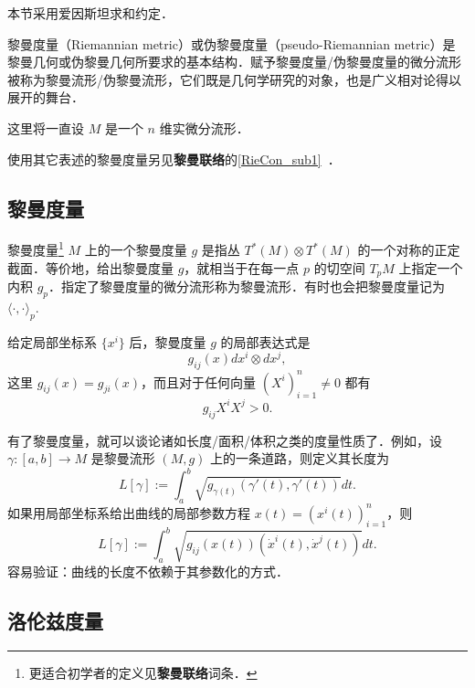 
本节采用爱因斯坦求和约定．

黎曼度量（Riemannian metric）或伪黎曼度量（pseudo-Riemannian metric）是黎曼几何或伪黎曼几何所要求的基本结构．赋予黎曼度量/伪黎曼度量的微分流形被称为黎曼流形/伪黎曼流形，它们既是几何学研究的对象，也是广义相对论得以展开的舞台．

这里将一直设 $M$ 是一个 $n$ 维实微分流形．

使用其它表述的黎曼度量另见\textbf{黎曼联络}的\autoref{RieCon_sub1}~．

\subsection{黎曼度量}
\begin{definition}{黎曼度量\footnote{更适合初学者的定义见\textbf{黎曼联络}词条．}}
$M$ 上的一个黎曼度量 $g$ 是指丛 $T^*(M)\otimes T^*(M)$ 的一个对称的正定截面．等价地，给出黎曼度量 $g$，就相当于在每一点 $p$ 的切空间 $T_pM$ 上指定一个内积 $g_p$．指定了黎曼度量的微分流形称为黎曼流形．有时也会把黎曼度量记为 $\langle\cdot,\cdot\rangle_p$.
\end{definition}
给定局部坐标系 $\{x^i\}$ 后，黎曼度量 $g$ 的局部表达式是
$$
g_{ij}(x)dx^i\otimes dx^j,
$$
这里 $g_{ij}(x)=g_{ji}(x)$，而且对于任何向量 $(X^i)_{i=1}^n\neq0$ 都有
$$
g_{ij}X^iX^j>0.
$$

有了黎曼度量，就可以谈论诸如长度/面积/体积之类的度量性质了．例如，设 $\gamma:[a,b]\to M$ 是黎曼流形 $(M,g)$ 上的一条道路，则定义其长度为
$$
L[\gamma]:=\int_{a}^b \sqrt{g_{\gamma(t)}(\gamma'(t),\gamma'(t))}dt.
$$
如果用局部坐标系给出曲线的局部参数方程 $x(t)=(x^i(t))_{i=1}^n$，则
$$
L[\gamma]:=\int_{a}^b \sqrt{g_{ij}(x(t))(\dot x^i(t),\dot x^j(t))}dt.
$$
容易验证：曲线的长度不依赖于其参数化的方式．

\subsection{洛伦兹度量}